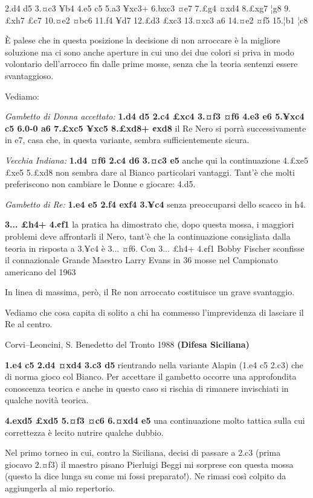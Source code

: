 \documentclass[
]{article}
\begin{document}
2.d4 d5 3.¤c3 ¥b4 4.e5 c5 5.a3 ¥xc3+ 6.bxc3 ¤e7 7.£g4 ¤xd4 8.£xg7 ¦g8
9.£xh7 £c7 10.¤e2 ¤bc6 11.f4 ¥d7 12.£d3 £xc3 13.¤xc3 a6 14.¤e2 ¤f5
15.¦b1 ¦c8

È palese che in questa posizione la decisione di non arroccare è la
migliore soluzione ma ci sono anche aperture in cui uno dei due colori
si priva in modo volontario dell'arrocco fin dalle prime mosse, senza
che la teoria sentenzi essere svantaggioso.

Vediamo:

\emph{Gambetto di Donna accettato:} \textbf{1.d4 d5 2.c4 £xc4 3.¤f3 ¤f6
4.e3 e6 5.¥xc4 c5 6.0-0 a6 7.£xc5 ¥xc5 8.£xd8+ ¢xd8} il Re Nero si porrà
successivamente in e7, casa che, in questa variante, sembra
sufficientemente sicura.

\emph{Vecchia Indiana:} \textbf{1.d4 ¤f6 2.c4 d6 3.¤c3 e5} anche qui la
continuazione 4.£xe5 £xe5 5.£xd8 non sembra dare al Bianco particolari
vantaggi. Tant'è che molti preferiscono non cambiare le Donne e giocare:
4.d5.

\emph{Gambetto di Re:} \textbf{1.e4 e5 2.f4 exf4 3.¥c4} senza
preoccuparsi dello scacco in h4.

\textbf{3... £h4+ 4.¢f1} la pratica ha dimostrato che, dopo questa
mossa, i maggiori problemi deve affrontarli il Nero, tant'è che la
continuazione consigliata dalla teoria in risposta a 3.¥c4 è 3... ¤f6.
Con 3... £h4+ 4.¢f1 Bobby Fischer sconfisse il connazionale Grande
Maestro Larry Evans in 36 mosse nel Campionato americano del 1963

In linea di massima, però, il Re non arroccato costituisce un grave
svantaggio.

Vediamo che cosa capita di solito a chi ha commesso l'imprevidenza di
lasciare il Re al centro.

Corvi--Leoncini, S. Benedetto del Tronto 1988 \textbf{(Difesa
Siciliana)}

\textbf{1.e4 c5 2.d4 ¤xd4 3.c3 d5} rientrando nella variante Alapin
(1.e4 c5 2.c3) che di norma gioco col Bianco. Per accettare il gambetto
occorre una approfondita conoscenza teorica e anche in questo caso si
rischia di rimanere invischiati in qualche novità teorica.

\textbf{4.exd5 £xd5 5.¤f3 ¤c6 6.¤xd4 e5} una continuazione molto tattica
sulla cui correttezza è lecito nutrire qualche dubbio.

Nel primo torneo in cui, contro la Siciliana, decisi di passare a 2.c3
(prima giocavo 2.¤f3) il maestro pisano Pierluigi Beggi mi sorprese con
questa mossa (questo la dice lunga su come mi fossi preparato!). Ne
rimasi così colpito da aggiungerla al mio repertorio.
\end{document}
